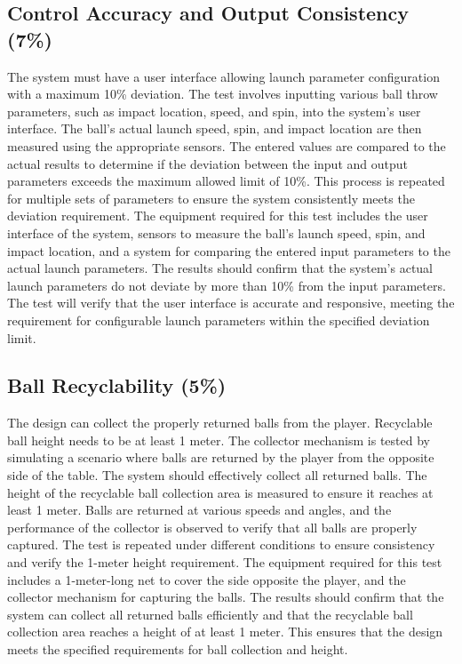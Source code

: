 \documentclass[12pt]{article}
\begin{document}
\subsection{Control Accuracy and Output Consistency (7\%)}
The system must have a user interface allowing launch parameter configuration with a maximum 10\% deviation. The test involves inputting various ball throw parameters, such as impact location, speed, and spin, into the system’s user interface. The ball's actual launch speed, spin, and impact location are then measured using the appropriate sensors. The entered values are compared to the actual results to determine if the deviation between the input and output parameters exceeds the maximum allowed limit of 10\%. This process is repeated for multiple sets of parameters to ensure the system consistently meets the deviation requirement. The equipment required for this test includes the user interface of the system, sensors to measure the ball's launch speed, spin, and impact location, and a system for comparing the entered input parameters to the actual launch parameters. The results should confirm that the system's actual launch parameters do not deviate by more than 10\% from the input parameters. The test will verify that the user interface is accurate and responsive, meeting the requirement for configurable launch parameters within the specified deviation limit.
\subsection{Ball Recyclability (5\%)}
The design can collect the properly returned balls from the player. Recyclable ball height needs to be at least 1 meter. The collector mechanism is tested by simulating a scenario where balls are returned by the player from the opposite side of the table. The system should effectively collect all returned balls. The height of the recyclable ball collection area is measured to ensure it reaches at least 1 meter. Balls are returned at various speeds and angles, and the performance of the collector is observed to verify that all balls are properly captured. The test is repeated under different conditions to ensure consistency and verify the 1-meter height requirement. The equipment required for this test includes a 1-meter-long net to cover the side opposite the player, and the collector mechanism for capturing the balls. The results should confirm that the system can collect all returned balls efficiently and that the recyclable ball collection area reaches a height of at least 1 meter. This ensures that the design meets the specified requirements for ball collection and height.
\end{document}
